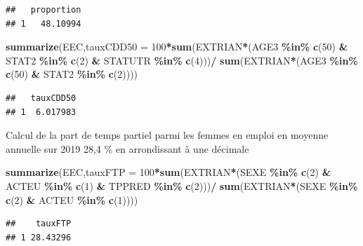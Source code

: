 \documentclass[
]{book}
\newenvironment{Shaded}{\begin{snugshade}}{\end{snugshade}}
\newcommand{\AttributeTok}[1]{\textcolor[rgb]{0.13,0.29,0.53}{#1}}
\newcommand{\DecValTok}[1]{\textcolor[rgb]{0.00,0.00,0.81}{#1}}
\newcommand{\FunctionTok}[1]{\textcolor[rgb]{0.13,0.29,0.53}{\textbf{#1}}}
\newcommand{\NormalTok}[1]{#1}
\newcommand{\SpecialCharTok}[1]{\textcolor[rgb]{0.81,0.36,0.00}{\textbf{#1}}}
\begin{document}
\begin{verbatim}
##   proportion
## 1   48.10994
\end{verbatim}

\begin{Shaded}
\begin{Highlighting}[]
\FunctionTok{summarize}\NormalTok{(EEC,}\AttributeTok{tauxCDD50 =} \DecValTok{100}\SpecialCharTok{*}\FunctionTok{sum}\NormalTok{(EXTRIAN}\SpecialCharTok{*}\NormalTok{(AGE3 }\SpecialCharTok{\%in\%} \FunctionTok{c}\NormalTok{(}\DecValTok{50}\NormalTok{) }\SpecialCharTok{\&}\NormalTok{ STAT2 }\SpecialCharTok{\%in\%} \FunctionTok{c}\NormalTok{(}\DecValTok{2}\NormalTok{) }\SpecialCharTok{\&}\NormalTok{ STATUTR }\SpecialCharTok{\%in\%} \FunctionTok{c}\NormalTok{(}\DecValTok{4}\NormalTok{)))}\SpecialCharTok{/}
                    \FunctionTok{sum}\NormalTok{(EXTRIAN}\SpecialCharTok{*}\NormalTok{(AGE3 }\SpecialCharTok{\%in\%} \FunctionTok{c}\NormalTok{(}\DecValTok{50}\NormalTok{) }\SpecialCharTok{\&}\NormalTok{ STAT2 }\SpecialCharTok{\%in\%} \FunctionTok{c}\NormalTok{(}\DecValTok{2}\NormalTok{))))}
\end{Highlighting}
\end{Shaded}

\begin{verbatim}
##   tauxCDD50
## 1  6.017983
\end{verbatim}

Calcul de la part de temps partiel parmi les femmes en emploi en moyenne annuelle sur 2019
28,4 \% en arrondissant à une décimale

\begin{Shaded}
\begin{Highlighting}[]
\FunctionTok{summarize}\NormalTok{(EEC,}\AttributeTok{tauxFTP =} \DecValTok{100}\SpecialCharTok{*}\FunctionTok{sum}\NormalTok{(EXTRIAN}\SpecialCharTok{*}\NormalTok{(SEXE }\SpecialCharTok{\%in\%} \FunctionTok{c}\NormalTok{(}\DecValTok{2}\NormalTok{) }\SpecialCharTok{\&}\NormalTok{ ACTEU }\SpecialCharTok{\%in\%} \FunctionTok{c}\NormalTok{(}\DecValTok{1}\NormalTok{) }\SpecialCharTok{\&}\NormalTok{ TPPRED }\SpecialCharTok{\%in\%} \FunctionTok{c}\NormalTok{(}\DecValTok{2}\NormalTok{)))}\SpecialCharTok{/}
            \FunctionTok{sum}\NormalTok{(EXTRIAN}\SpecialCharTok{*}\NormalTok{(SEXE }\SpecialCharTok{\%in\%} \FunctionTok{c}\NormalTok{(}\DecValTok{2}\NormalTok{) }\SpecialCharTok{\&}\NormalTok{ ACTEU }\SpecialCharTok{\%in\%} \FunctionTok{c}\NormalTok{(}\DecValTok{1}\NormalTok{))))                                                 }
\end{Highlighting}
\end{Shaded}

\begin{verbatim}
##    tauxFTP
## 1 28.43296
\end{verbatim}

  
\end{document}
